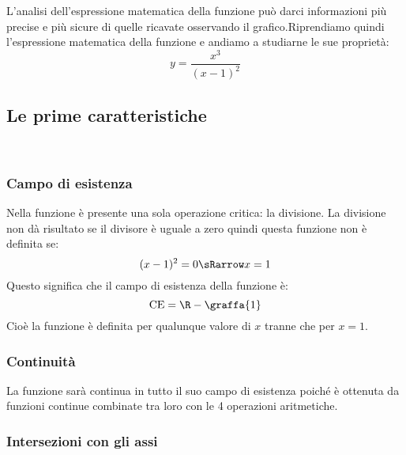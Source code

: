 L'analisi dell'espressione matematica della funzione può darci informazioni 
più precise e più sicure di quelle ricavate osservando il grafico.Riprendiamo 
quindi l'espressione matematica della funzione e andiamo a studiarne le sue 
proprietà:
\[y=\frac{x^3}{(x-1)^2}\]


\subsection{Le prime caratteristiche}
\label{subsec:prime_caratteristiche}
\mbox{ }

\begin{minipage}{.60\linewidth}

\subsubsection{Campo di esistenza}
Nella funzione è presente una sola operazione critica: la divisione. La 
divisione non dà risultato se il divisore è uguale a zero quindi questa 
funzione non è definita se:
\[(x-1)^2 = 0 \sRarrow x=1\]
Questo significa che il campo di esistenza della funzione è:
\[\text{CE} = \R - \graffa{1}\]
Cioè la funzione è definita per qualunque valore di \(x\) tranne che per 
\(x=1\).

\end{minipage}
\hfill
\begin{minipage}{.38\linewidth}
 \begin{center}
\cefunzionea
 \end{center}
\end{minipage}

\subsubsection{Continuità}
La funzione sarà continua in tutto il suo campo di esistenza poiché è 
ottenuta da funzioni continue combinate tra loro con le 4 operazioni 
aritmetiche.


\subsubsection{Intersezioni con gli assi}
 
